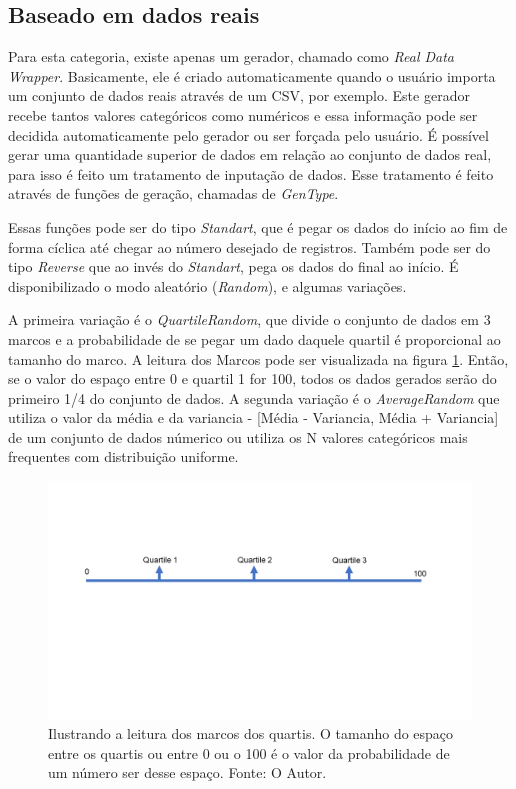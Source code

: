\documentclass[
	12pt,				%
	openright,			%
	twoside,			%
	a4paper,			%
	english,			%
	brazil				%
	]{abntex2}
\begin{document}
		\subsection{Baseado em dados reais}
			Para esta categoria, existe apenas um gerador, chamado como \emph{Real Data Wrapper}.
			Basicamente, ele é criado automaticamente quando o usuário importa um conjunto de dados reais através de um CSV, por exemplo.
			Este gerador recebe tantos valores categóricos como numéricos e essa informação pode ser decidida automaticamente pelo gerador ou ser forçada pelo usuário.
			É possível gerar uma quantidade superior de dados em relação ao conjunto de dados real, para isso é feito um tratamento de inputação de dados.
			Esse tratamento é feito através de funções de geração, chamadas de \emph{GenType}.
			\par
			Essas funções pode ser do tipo \emph{Standart}, que é pegar os dados do início ao fim de forma cíclica até chegar ao número desejado de registros.
			Também pode ser do tipo \emph{Reverse} que ao invés do \emph{Standart}, pega os dados do final ao início.
			É disponibilizado o modo aleatório (\emph{Random}), e algumas variações.
			\par
			A primeira variação é o \emph{QuartileRandom}, que divide o conjunto de dados em 3 marcos e a probabilidade de se pegar um dado daquele quartil é proporcional ao tamanho do marco.
			A leitura dos Marcos pode ser visualizada na figura \ref{fig:leituraMarco}. Então, se o valor do espaço entre 0 e quartil 1 for 100, todos os dados gerados serão do primeiro 1/4 do conjunto de dados.
			A segunda variação é o \emph{AverageRandom} que utiliza o valor da média e da variancia - [Média - Variancia, Média + Variancia] de um conjunto de dados númerico ou utiliza os N valores categóricos mais frequentes com distribuição uniforme.
			\begin{figure}[h]
				\centering
				\includegraphics[width=\linewidth]{./figures/prototipo/quartil.png}
				\caption{Ilustrando a leitura dos marcos dos quartis. O tamanho do espaço entre os quartis ou entre 0 ou o 100 é o valor da probabilidade de um número ser desse espaço. Fonte: O Autor.}
				\label{fig:leituraMarco}
			\end{figure}
\end{document}
